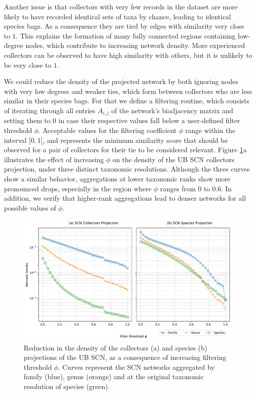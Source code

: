 Another issue is that collectors with very few records in the dataset are more likely to have recorded identical sets of taxa by chance, leading to identical species bags.
As a consequence they are tied by edges with similarity very close to $1$.
This explains the formation of many fully connected regions containing low-degree nodes, which contribute to increasing network density.
More experienced collectors can be observed to have high similarity with others, but it is unlikely to be very close to $1$.

We could reduce the density of the projected network by both ignoring nodes with very low degrees and weaker ties, which form between collectors who are less similar in their species bags.
For that we define a filtering routine, which consists of iterating through all entries $A_{i,j}$ of the network's biadjacency matrix and setting them to $0$ in case their respective values fall below a user-defined filter threshold $\phi$.
Acceptable values for the filtering coefficient $\phi$ range within the interval $[0,1[$, and represents the minimum similarity score that should be observed for a pair of collectors for their tie to be considered relevant.
Figure \ref{fig:ub_scn_filter_thresh}a illustrates the effect of increasing $\phi$ on the density of the UB SCN collectors projection, under three distinct taxonomic resolutions.
Although the three curves show a similar behavior, aggregations at lower taxonomic ranks show more pronounced drops, especially in the region where $\phi$ ranges from $0$ to $0.6$.
In addition, we verify that higher-rank aggregations lead to denser networks for all possible values of $\phi$.

\begin{figure}[!ht]
  	\centering
    \includegraphics[width=\linewidth]{figures/casestudy_ub/scn_filter_thresh.pdf}
    \caption[Reduction in the density of the species and collectors projections of the UB SCN, as a consequence of increasing filtering threshold.]{ Reduction in the density of the collectors (a) and species (b) projections of the UB SCN, as a consequence of increasing filtering threshold $\phi$. Curves represent the SCN networks aggregated by family (blue), genus (orange) and at the original taxonomic resolution of species (green). }
    \label{fig:ub_scn_filter_thresh}
\end{figure}

